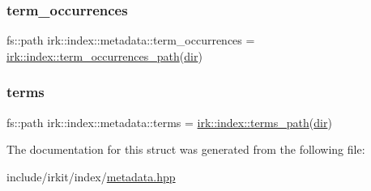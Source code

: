 \mbox{\label{structirk_1_1index_1_1metadata_a9abaf09f8e29f9be71171242db8839ec}} 
\subsubsection{\texorpdfstring{term\+\_\+occurrences}{term\_occurrences}}
{\footnotesize\ttfamily fs\+::path irk\+::index\+::metadata\+::term\+\_\+occurrences = \mbox{\hyperlink{namespaceirk_1_1index_a1cd8d96d17fa744fdcc7cb3321b4dd25}{irk\+::index\+::term\+\_\+occurrences\+\_\+path}}(\mbox{\hyperlink{structirk_1_1index_1_1metadata_a355b4325c022cd152e68fc18b1775fc6}{dir}})}

\mbox{\label{structirk_1_1index_1_1metadata_ac3c1d47e784d486a72d249cc5b7675d2}} 
\subsubsection{\texorpdfstring{terms}{terms}}
{\footnotesize\ttfamily fs\+::path irk\+::index\+::metadata\+::terms = \mbox{\hyperlink{namespaceirk_1_1index_a003bce4c8d885ec3e8ffffd7dc53222f}{irk\+::index\+::terms\+\_\+path}}(\mbox{\hyperlink{structirk_1_1index_1_1metadata_a355b4325c022cd152e68fc18b1775fc6}{dir}})}



The documentation for this struct was generated from the following file\+:\begin{DoxyCompactItemize}
\item 
include/irkit/index/\mbox{\hyperlink{metadata_8hpp}{metadata.\+hpp}}\end{DoxyCompactItemize}
